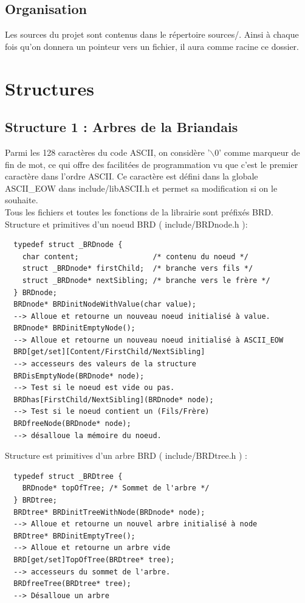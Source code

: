 \documentclass[a4paper,8pt]{report}
\begin{document}
\section*{Organisation}\label{sec:name}
Les sources du projet sont contenus dans le répertoire sources/.
Ainsi à chaque fois qu'on donnera un pointeur vers un fichier, il aura comme racine ce dossier.

\chapter{Structures}

\section*{Structure 1 : Arbres de la Briandais}\label{sec:name}
Parmi les 128 caractères du code ASCII, on considère '$\backslash$0' comme marqueur de fin de mot, ce qui offre des facilitées de programmation vu que c'est le premier caractère dans l'ordre ASCII. Ce caractère est défini dans la globale ASCII\_EOW dans include/libASCII.h et permet sa modification si on le souhaite.\\
Tous les fichiers et toutes les fonctions de la librairie sont préfixés BRD.\\
Structure et primitives d'un noeud BRD ( include/BRDnode.h ):
\begin{verbatim}
  typedef struct _BRDnode {
    char content;                 /* contenu du noeud */
    struct _BRDnode* firstChild;  /* branche vers fils */
    struct _BRDnode* nextSibling; /* branche vers le frère */ 
  } BRDnode;
  BRDnode* BRDinitNodeWithValue(char value);
  --> Alloue et retourne un nouveau noeud initialisé à value.
  BRDnode* BRDinitEmptyNode();
  --> Alloue et retourne un nouveau noeud initialisé à ASCII_EOW
  BRD[get/set][Content/FirstChild/NextSibling]
  --> accesseurs des valeurs de la structure
  BRDisEmptyNode(BRDnode* node);
  --> Test si le noeud est vide ou pas.
  BRDhas[FirstChild/NextSibling](BRDnode* node);
  --> Test si le noeud contient un (Fils/Frère)
  BRDfreeNode(BRDnode* node);
  --> désalloue la mémoire du noeud.
\end{verbatim}
Structure est primitives d'un arbre BRD ( include/BRDtree.h ) :
\begin{verbatim}
  typedef struct _BRDtree {
    BRDnode* topOfTree; /* Sommet de l'arbre */
  } BRDtree;
  BRDtree* BRDinitTreeWithNode(BRDnode* node);
  --> Alloue et retourne un nouvel arbre initialisé à node
  BRDtree* BRDinitEmptyTree();
  --> Alloue et retourne un arbre vide
  BRD[get/set]TopOfTree(BRDtree* tree);
  --> accesseurs du sommet de l'arbre.
  BRDfreeTree(BRDtree* tree);
  --> Désalloue un arbre
\end{verbatim}
\end{document}

